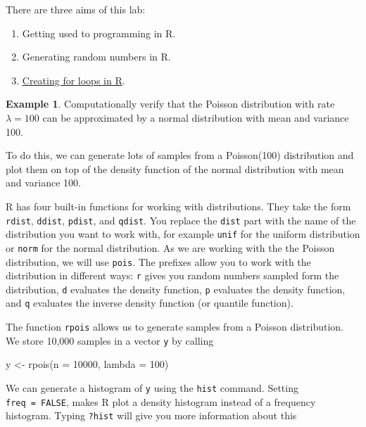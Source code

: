 \documentclass[
]{book}
\newenvironment{Shaded}{\begin{snugshade}}{\end{snugshade}}
\newcommand{\AttributeTok}[1]{\textcolor[rgb]{0.77,0.63,0.00}{#1}}
\newcommand{\DecValTok}[1]{\textcolor[rgb]{0.00,0.00,0.81}{#1}}
\newcommand{\FunctionTok}[1]{\textcolor[rgb]{0.00,0.00,0.00}{#1}}
\newcommand{\NormalTok}[1]{#1}
\newcommand{\OtherTok}[1]{\textcolor[rgb]{0.56,0.35,0.01}{#1}}
\providecommand{\tightlist}{%
  \setlength{\itemsep}{0pt}\setlength{\parskip}{0pt}}
\theoremstyle{definition}
\theoremstyle{definition}
\newtheorem{example}{Example}[chapter]
\theoremstyle{definition}
\theoremstyle{definition}
\theoremstyle{remark}
\begin{document}
There are three aims of this lab:

\begin{enumerate}
\def\labelenumi{\arabic{enumi}.}
\tightlist
\item
  Getting used to programming in R.
\item
  Generating random numbers in R.
\item
  \href{https://www.w3schools.com/r/r_for_loop.asp}{Creating for loops in R}.
\end{enumerate}

\begin{example}
Computationally verify that the Poisson distribution with rate \(\lambda = 100\) can be approximated by a normal distribution with mean and variance 100.

To do this, we can generate lots of samples from a Poisson(100) distribution and plot them on top of the density function of the normal distribution with mean and variance 100.

R has four built-in functions for working with distributions. They take the form \texttt{rdist}, \texttt{ddist}, \texttt{pdist}, and \texttt{qdist}. You replace the \texttt{dist} part with the name of the distribution you want to work with, for example \texttt{unif} for the uniform distribution or \texttt{norm} for the normal distribution. As we are working with the the Poisson distribution, we will use \texttt{pois}. The prefixes allow you to work with the distribution in different ways: \texttt{r} gives you random numbers sampled form the distribution, \texttt{d} evaluates the density function, \texttt{p} evaluates the density function, and \texttt{q} evaluates the inverse density function (or quantile function).

The function \texttt{rpois} allows us to generate samples from a Poisson distribution. We store 10,000 samples in a vector \texttt{y} by calling

\begin{Shaded}
\begin{Highlighting}[]
\NormalTok{y }\OtherTok{\textless{}{-}} \FunctionTok{rpois}\NormalTok{(}\AttributeTok{n =} \DecValTok{10000}\NormalTok{, }\AttributeTok{lambda =} \DecValTok{100}\NormalTok{)}
\end{Highlighting}
\end{Shaded}

We can generate a histogram of \texttt{y} using the \texttt{hist} command. Setting \texttt{freq\ =\ FALSE}, makes R plot a density histogram instead of a frequency histogram. Typing \texttt{?hist} will give you more information about this


\end{example}
\end{document}
